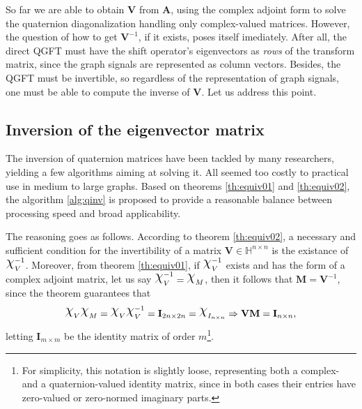 So far we are able to obtain $\mathbf{V}$ from $\mathbf{A}$, using the complex adjoint form to solve the quaternion diagonalization handling only complex-valued matrices. However, the question of how to get $\mathbf{V}^{-1}$, if it exists, poses itself imediately. After all, the direct QGFT must have the shift operator's eigenvectors as \textit{rows} of the transform matrix, since the graph signals are represented as column vectors. Besides, the QGFT must be invertible, so regardless of the representation of graph signals, one must be able to compute the inverse of $\mathbf{V}$. Let us address this point.

\subsection{Inversion of the eigenvector matrix}
The inversion of quaternion matrices have been tackled by many researchers, yielding a few algorithms aiming at solving it.  All seemed too costly to practical use in medium to large graphs. Based on theorems \ref{th:equiv01} and \ref{th:equiv02},
the algorithm \ref{alg:qinv} is proposed to provide a reasonable balance between processing speed and broad applicability.

The reasoning goes as follows. According to theorem \ref{th:equiv02}, a necessary and sufficient condition for the invertibility of a matrix $\mathbf{V} \in \mathbb{H}^{n \times n}$ is the existance of $\rchi^{-1}_{V}$. Moreover, from theorem \ref{th:equiv01}, if $\rchi^{-1}_{V}$ exists and has the form of a complex adjoint matrix, let us say $\rchi_{V}^{-1} = \rchi_{M}$, then it follows that $\mathbf{M} = \mathbf{V}^{-1}$, since the theorem guarantees that
\begin{equation}
\rchi_{V} \rchi_{M} = \rchi_{V} \rchi_{V}^{-1} = \mathbf{I}_{2n \times 2n} = \rchi_{I_{n \times n}}
\Rightarrow \mathbf{V} \mathbf{M} = \mathbf{I}_{n \times n},
\end{equation}
letting $\mathbf{I}_{m \times m}$ be the identity matrix of order $m$\footnote{For simplicity, this notation is slightly loose, representing both a complex- and a quaternion-valued identity matrix, since in both cases their entries have zero-valued or zero-normed imaginary parts.}.

